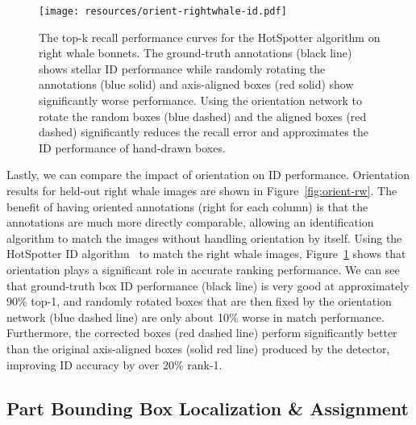 \begin{figure}[!t]
    \begin{center}
        \vspace{1cm}
        \texttt{[image: resources/orient-rightwhale-id.pdf]}
    \end{center}
    \caption{The top-k recall performance curves for the HotSpotter algorithm on right whale bonnets.  The ground-truth annotations (black line) shows stellar ID performance while randomly rotating the annotations (blue solid) and axis-aligned boxes (red solid) show significantly worse performance.  Using the orientation network to rotate the random boxes (blue dashed) and the aligned boxes (red dashed) significantly reduces the recall error and approximates the ID performance of hand-drawn boxes.}
    \label{fig:orient-rw-id}
\end{figure}

Lastly, we can compare the impact of orientation on ID performance.  Orientation results for held-out right whale images are shown in Figure~\ref{fig:orient-rw}.  The benefit of having oriented annotations (right for each column) is that the annotations are much more directly comparable, allowing an identification algorithm to match the images without handling orientation by itself.  Using the HotSpotter ID algorithm~\cite{crall_hotspotter_2013} to match the right whale images, Figure~\ref{fig:orient-rw-id} shows that orientation plays a significant role in accurate ranking performance.  We can see that ground-truth box ID performance (black line) is very good at approximately 90\% top-1, and randomly rotated boxes that are then fixed by the orientation network (blue dashed line) are only about 10\% worse in match performance. Furthermore, the corrected boxes (red dashed line) perform significantly better than the original axis-aligned boxes (solid red line) produced by the detector, improving ID accuracy by over 20\% rank-1.

\subsection{Part Bounding Box Localization \& Assignment}

